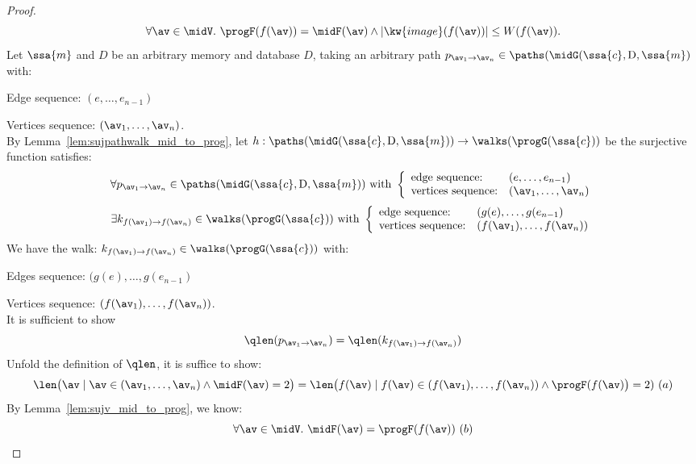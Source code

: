{\begin{proof}
%
$$
\forall \av \in \midV. ~ \progF(f(\av)) = \midF(\av) 
\land |\kw{image}(f(\av))| \leq W(f(\av)).
$$
%
%
%
Let $\ssa{m}$ and $D$ be an arbitrary memory and database $D$,
taking an arbitrary path $p_{\av_1 \to \av_n} \in \paths(\midG(\ssa{c}, \text{D}, \ssa{m})$ with:
%
\item Edge sequence: $(e, \ldots, e_{n-1})$
%
\item Vertices sequence: $(\av_1, \ldots, \av_n)$.
\\
By Lemma~\ref{lem:sujpathwalk_mid_to_prog}, let $h: \paths(\midG(\ssa{c}, \text{D}, \ssa{m})) \to \walks(\progG(\ssa{c}))$ be the surjective function satisfies:
%
\[
	\forall p_{\av_1 \to \av_n} \in \paths(\midG(\ssa{c}, \text{D}, \ssa{m}))
	\text{ with }
	\left\{
	\begin{array}{ll}
	\mbox{edge sequence:} & (e, \ldots, e_{n-1})
	\\ 
	\mbox{vertices sequence:} & (\av_1, \ldots, \av_n)
	\end{array}
	\right.
\]
%
\[
	\exists k_{f(\av_1) \to f(\av_n)} \in \walks(\progG(\ssa{c}))
	\text{ with }
	\left\{
	\begin{array}{ll}
	\mbox{edge sequence:} & (g(e), \ldots, g(e_{n-1}) 
	\\ 
	\mbox{vertices sequence:} & (f(\av_1), \ldots, f(\av_{n}))
	\end{array}
	\right.
\]
%
We have the walk:
$k_{f(\av_1) \to f(\av_n)} \in \walks(\progG(\ssa{c}))$ with:
%
\item Edges sequence: $(g(e), \ldots, g(e_{n-1}) $
%
\item Vertices sequence: $(f(\av_1), \ldots, f(\av_{n}))$.
\\
It is sufficient to show 
%
\[
	\qlen(p_{\av_1 \to \av_n}) = \qlen(k_{f(\av_1) \to f(\av_n)})
\]
%
Unfold the definition of $\qlen$, it is suffice to show:
\[
\len \big( \av \mid \av \in (\av_1, \ldots, \av_n) \land \midF(\av) = 2 \big) 
= \len \big(f(\av) \mid f(\av) \in (f(\av_1), \ldots, f(\av_{n})) \land \progF(f(\av)\big) = 2)	
~ (a)
\]
%
By Lemma~\ref{lem:sujv_mid_to_prog}, we know:
%
\[
	\forall \av \in \midV. ~ \midF(\av) = \progF(f(\av)) ~(b)
\]
\end{proof}}
